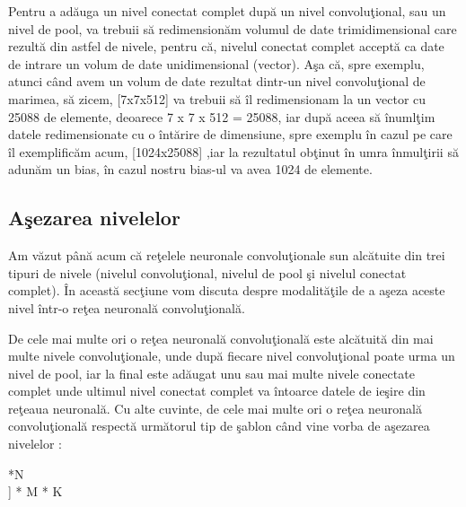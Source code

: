 Pentru a ad\u{a}uga un nivel conectat complet dup\u{a} un nivel convolu\c{t}ional, sau un nivel de pool, va trebuii s\u{a} redimension\u{a}m volumul de date trimidimensional care rezult\u{a} din astfel de nivele, pentru c\u{a}, nivelul conectat complet accept\u{a} ca date de intrare un volum de date unidimensional (vector). A\c{s}a c\u{a}, spre exemplu, atunci c\^{a}nd avem un volum de date rezultat dintr-un nivel convolu\c{t}ional de marimea, s\u{a} zicem, [7x7x512] va trebuii s\u{a} \^{i}l redimensionam la un vector cu 25088 de elemente, deoarece 7 x 7 x 512 = 25088, iar dup\u{a} aceea s\u{a} \^{i}numl\c{t}im datele redimensionate cu o \^{i}nt\u{a}rire de dimensiune, spre exemplu \^{i}n cazul pe care \^{i}l exemplific\u{a}m acum, [1024x25088] ,iar la rezultatul ob\c{t}inut \^{i}n umra \^{i}nmul\c{t}irii s\u{a} adun\u{a}m un bias, \^{i}n cazul nostru bias-ul  va avea 1024 de elemente.

\subsection{A\c{s}ezarea nivelelor}

Am v\u{a}zut p\^{a}n\u{a} acum c\u{a} re\c{t}elele neuronale convolu\c{t}ionale sun alc\u{a}tuite din trei tipuri de nivele (nivelul convolu\c{t}ional, nivelul de pool \c{s}i nivelul conectat complet). \^{I}n aceast\u{a} sec\c{t}iune vom discuta despre modalit\u{a}\c{t}ile de a a\c{s}eza aceste nivel \^{i}ntr-o re\c{t}ea neuronal\u{a} convolu\c{t}ional\u{a}.

\par

De cele mai multe ori o re\c{t}ea neuronal\u{a} convolu\c{t}ional\u{a} este alc\u{a}tuit\u{a} din mai multe nivele convolu\c{t}ionale, unde dup\u{a} fiecare nivel convolu\c{t}ional poate urma un nivel de pool, iar la final este ad\u{a}ugat unu sau mai multe nivele conectate complet unde ultimul nivel conectat complet va \^{i}ntoarce datele de ie\c{s}ire din re\c{t}eaua neuronal\u{a}. Cu alte cuvinte, de cele mai multe ori o re\c{t}ea neuronal\u{a} convolu\c{t}ional\u{a} respect\u{a} urm\u{a}torul tip de \c{s}ablon c\^{a}nd vine vorba de a\c{s}ezarea nivelelor :

\par

 \longrightarrow [[\text{Nivel convolu\c{t}ional} \longrightarrow \text{ReLU}]*N \longrightarrow \\
\longrightarrow {} ] * M  * K  \longrightarrow \\
\longrightarrow {} \longrightarrow {}

